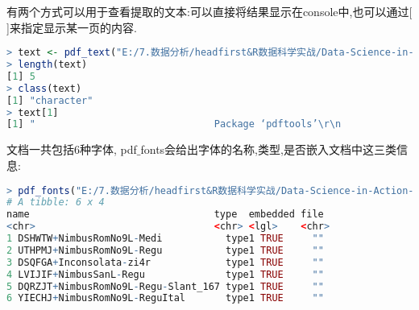 \documentclass[11pt,a4paper,oneside]{book}
\begin{document}
有两个方式可以用于查看提取的文本:可以直接将结果显示在console中,也可以通过[ ]来指定显示某一页的内容.
\begin{lstlisting}[language=r]
> text <- pdf_text("E:/7.数据分析/headfirst&R数据科学实战/Data-Science-in-Action-R-Tools-and-Case-Studies-master/chapter1/RawData/pdftools.pdf")
> length(text)
[1] 5
> class(text)
[1] "character"
> text[1]
[1] "                               Package ‘pdftools’\r\n                                            May 27, 2018\r\nType Package\r\nTitle Text Extraction, Rendering and Converting of PDF Documents\r\nVersion 1.8\r\nDescription Utilities based on 'libpoppler' for extracting text, fonts, attachments and\r\n      metadata from a PDF file. Also supports high quality rendering of PDF documents info\r\n      PNG, JPEG, TIFF format, or into raw bitmap vectors for further processing in R.\r\nLicense MIT + file LICENSE\r\nURL https://ropensci.org/blog/2016/03/01/pdftools-and-jeroen (blog)\r\n      https://github.com/ropensci/pdftools#readme (devel)\r\n      https://poppler.freedesktop.org (upstream)\r\nBugReports https://github.com/ropensci/pdftools/issues\r\nSystemRequirements Poppler C++ API: libpoppler-cpp-dev (deb) or\r\n      poppler-cpp-devel (rpm). The unit tests also require the\r\n      'poppler-data' package (rpm/deb)\r\nEncoding UTF-8\r\nImports Rcpp (>= 0.12.12)\r\nLinkingTo Rcpp\r\nSuggests jpeg, png, webp, testthat\r\nRoxygenNote 6.0.1.9000\r\nNeedsCompilation yes\r\nAuthor Jeroen Ooms [aut, cre] (<https://orcid.org/0000-0002-4035-0289>)\r\nMaintainer Jeroen Ooms <jeroen@berkeley.edu>\r\nRepository CRAN\r\nDate/Publication 2018-05-27 13:56:09 UTC\r\nR topics documented:\r\n         pdf_info . . . . . . . . . . . . . . . . . . . . . . . . . . . . . . . . . . . . . . . . . . . 2\r\n         pdf_render_page . . . . . . . . . . . . . . . . . . . . . . . . . . . . . . . . . . . . . .    3\r\nIndex                                                                                                   5\r\n                                                    1\r\n"
\end{lstlisting}
文档一共包括6种字体, pdf$ \_ $fonts会给出字体的名称,类型,是否嵌入文档中这三类信息:
\begin{lstlisting}[language=r]
> pdf_fonts("E:/7.数据分析/headfirst&R数据科学实战/Data-Science-in-Action-R-Tools-and-Case-Studies-master/chapter1/RawData/pdftools.pdf")
# A tibble: 6 x 4
name                                type  embedded file 
<chr>                               <chr> <lgl>    <chr>
1 DSHWTW+NimbusRomNo9L-Medi           type1 TRUE     ""   
2 UTHPMJ+NimbusRomNo9L-Regu           type1 TRUE     ""   
3 DSQFGA+Inconsolata-zi4r             type1 TRUE     ""   
4 LVIJIF+NimbusSanL-Regu              type1 TRUE     ""   
5 DQRZJT+NimbusRomNo9L-Regu-Slant_167 type1 TRUE     ""   
6 YIECHJ+NimbusRomNo9L-ReguItal       type1 TRUE     ""   
\end{lstlisting}
\end{document}
